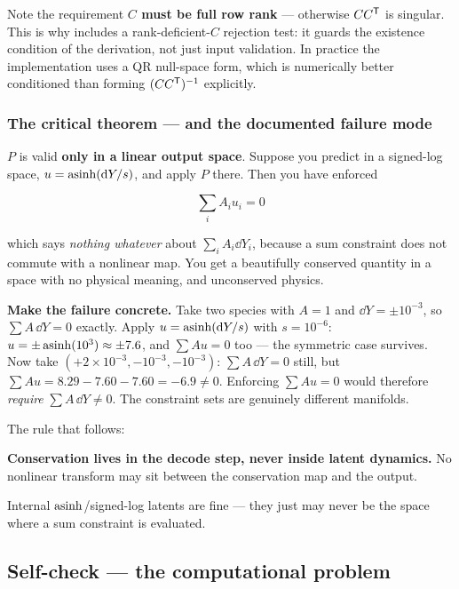 Note the requirement \textbf{$C$ must be full row rank} --- otherwise $CC^{\mathsf{T}}$ is
singular. This is why  includes a
rank-deficient-$C$ rejection test: it guards the existence condition of the
derivation, not just input validation. In practice the implementation uses a QR
null-space form, which is numerically better conditioned than forming
$(CC^{\mathsf{T}})^{-1}$ explicitly.

\subsubsection{The critical theorem --- and the documented failure mode}
\label{sec:criticaltheorem}

$P$ is valid \textbf{only in a linear output space}. Suppose you predict in a
signed-log space, $u = \operatorname{asinh}(\mathrm{d} Y/s)$, and apply $P$ there. Then you have
enforced

\begin{equation*}
\sum_i A_i u_i = 0
\end{equation*}

which says \emph{nothing whatever} about $\sum_i A_i \dd Y_i$, because a sum
constraint does not commute with a nonlinear map. You get a beautifully
conserved quantity in a space with no physical meaning, and unconserved physics.

\textbf{Make the failure concrete.} Take two species with $A = 1$ and
$\dd Y = \pm10^{-3}$, so $\sum A\,\dd Y = 0$ exactly. Apply
$u = \operatorname{asinh}(\mathrm{d} Y/s)$ with $s = 10^{-6}$: $u = \pm\operatorname{asinh}(10^{3}) \approx
\pm7.6$, and $\sum A u = 0$ too --- the symmetric case survives. Now take
$(+2\times10^{-3}, -10^{-3}, -10^{-3})$: $\sum A\,\dd Y = 0$ still, but
$\sum A u = 8.29 - 7.60 - 7.60 = -6.9 \neq 0$. Enforcing $\sum A u = 0$ would
therefore \emph{require} $\sum A\,\dd Y \neq 0$. The constraint sets are
genuinely different manifolds.

The rule that follows:

\begin{invariant}
\textbf{Conservation lives in the decode step, never inside latent dynamics.}
No nonlinear transform may sit between the conservation map and the output.
\end{invariant}

Internal $\operatorname{asinh}$/signed-log latents are fine --- they just may never be the
space where a sum constraint is evaluated.

\subsection*{Self-check --- the computational problem}
\label{sec:selfcheck-computational}

